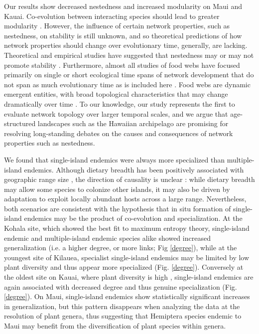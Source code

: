 Our results show decreased nestedness and increased modularity on Maui
and Kauai. Co-evolution between interacting species should lead to
greater modularity \citep{donatti2011, nuismer2013}. However, the
influence of certain network properties, such as nestedness, on
stability is still unknown, and so theoretical predictions of how
network properties should change over evolutionary time, generally,
are lacking. Theoretical and empirical studies have suggested that
nestedness may or may not promote stability \citep{allesina2012,
suweis2014}. Furthermore, almost all studies of food webs have focused
primarily on single or short ecological time spans of network
development that do not span as much evolutionary time as is included
here \citep[e.g.][]{albrecht2010}. Food webs are dynamic emergent
entities, with broad topological characteristics that may change
dramatically over time \citep[e.g.][]{yeakel2013}. To our knowledge,
our study represents the first to evaluate network topology over
larger temporal scales, and we argue that age-structured landscapes
such as the Hawaiian archipelago are promising for resolving
long-standing debates on the causes and consequences of network
properties such as nestedness.

We found that single-island endemics were always more specialized than
multiple-island endemics. Although dietary breadth has been positively
associated with geographic range size \citep{lewinsohn2005}, the
direction of causality is unclear \citep{slatyer2013}: while dietary
breadth may allow some species to colonize other islands, it may also
be driven by adaptation to exploit locally abundant hosts across a
large range. Nevertheless, both scenarios are consistent with the
hypothesis that in situ formation of single-island endemics may be the
product of co-evolution and specialization. At the Kohala site, which
showed the best fit to maximum entropy theory, single-island endemic
and multiple-island endemic species alike showed increased
generalization (i.e. a higher degree, or more links; Fig
\ref{degree}), while at the youngest site of Kilauea, specialist
single-island endemics may be limited by low plant diversity and thus
appear more specialized (Fig. \ref{degree}). Conversely at the oldest
site on Kauai, where plant diversity is high \citep{kitayama1995},
single-island endemics are again associated with decreased degree and
thus genuine specialization (Fig. \ref{degree}). On Maui,
single-island endemics show statistically significant increases in
generalization, but this pattern disappears when analyzing the data at
the resolution of plant genera, thus suggesting that Hemiptera species
endemic to Maui may benefit from the diversification of plant species
within genera.


